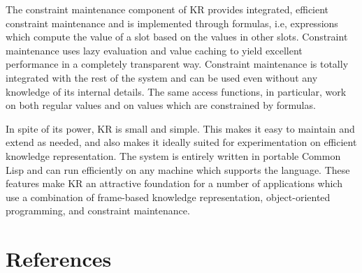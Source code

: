 The constraint maintenance component of KR provides integrated, efficient
constraint maintenance and is implemented through formulas, i.e,
expressions which compute the value of a slot based on the values in other
slots.  Constraint maintenance uses lazy evaluation and value caching
to yield excellent performance in a completely transparent way.  Constraint
maintenance is totally integrated with the rest of the system and can be
used even without any knowledge of its internal details.  The same access
functions, in particular, work on both regular values and on values which
are constrained by formulas.

In spite of its power, KR is small and simple.  This makes it easy to
maintain and extend as needed, and also makes it ideally suited for
experimentation on efficient knowledge representation.  The system is
entirely written in portable Common Lisp and can run efficiently on any
machine which supports the language.  These features make KR an attractive
foundation for a number of applications which use a combination of
frame-based knowledge representation, object-oriented programming, and
constraint maintenance.


\chapter*{References}


